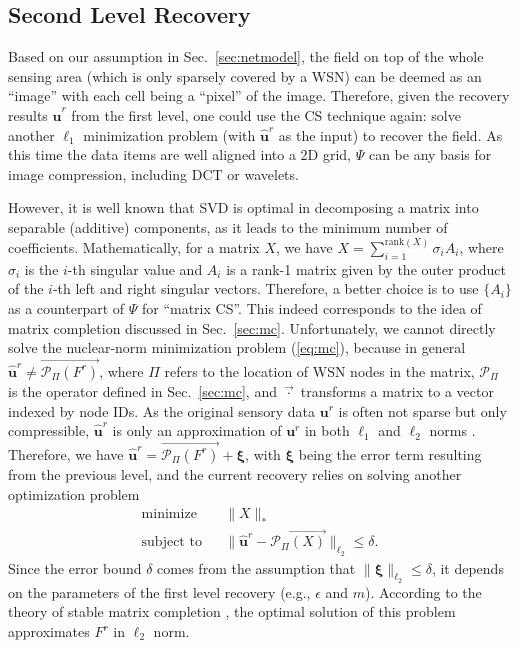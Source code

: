 \documentclass[conference]{IEEEtran}
\begin{document}
  \subsection{Second Level Recovery} \label{sec:2level}
Based on our assumption in Sec.~\ref{sec:netmodel}, the field on top of the whole sensing area (which is only sparsely covered by a WSN) can be deemed as an ``image'' with each cell being a ``pixel'' of the image. Therefore, given the recovery results $\mathbf{\hat{u}}^r$ from the first level, one could use the CS technique again: solve another $\ell_1$ minimization problem (with $\mathbf{\hat{u}}^r$ as the input) to recover the field. As this time the data items are well aligned into a 2D grid, $\Psi$ can be any basis for image compression, including DCT or wavelets.

    However, it is well known that SVD is optimal in decomposing a matrix into separable (additive) components, as it leads to the minimum number of coefficients. Mathematically, for a matrix $X$, we have $X = \sum_{i=1}^{\mathrm{rank}(X)}\sigma_i A_i$, where $\sigma_i$ is the $i$-th singular value and $A_i$ is a rank-1 matrix given by the outer product of the $i$-th left and right singular vectors. Therefore, a better choice is to use $\{A_i\}$ as a counterpart of $\Psi$ for ``matrix CS''. This indeed corresponds to the idea of matrix completion discussed in Sec.~\ref{sec:mc}. Unfortunately, we cannot directly solve the nuclear-norm minimization problem (\ref{eq:mc}), because in general $\mathbf{\hat{u}}^r \not= \overrightarrow{\mathcal{P}_\Pi(F^r)}$, where $\Pi$ refers to the location of WSN nodes in the matrix, $\mathcal{P}_\Pi$ is the operator defined in Sec.~\ref{sec:mc}, and $\overrightarrow{\cdot}$ transforms a matrix to a vector indexed by node IDs. As the original sensory data $\mathbf{u}^r$ is often not sparse but only compressible, $\mathbf{\hat{u}}^r$ is only an approximation of $\mathbf{u}^r$ in both $\ell_1$ and $\ell_2$ norms \cite{Candes-SPMag08}. Therefore, we have $\mathbf{\hat{u}}^r = \overrightarrow{\mathcal{P}_\Pi(F^r)} + \boldsymbol{\xi}$, with $\boldsymbol{\xi}$ being the error term resulting from the previous level, and the current recovery relies on solving another optimization problem
    \begin{eqnarray}
\mathrm{minimize} && \|X\|_\ast \label{eq:mc+} \\
\mbox{subject to} && \|\mathbf{\hat{u}}^r - \overrightarrow{\mathcal{P}_\Pi(X)}\|_{\ell_2} \le \delta. \nonumber
\end{eqnarray}
Since the error bound $\delta$ comes from the assumption that $\|\boldsymbol{\xi}\|_{\ell_2} \le \delta$, it depends on the parameters of the first level recovery (e.g., $\epsilon$ and $m$). According to the theory of stable matrix completion \cite{CandesP-ProcIEEE10}, the optimal solution of this problem approximates $F^r$ in $\ell_2$ norm.
\end{document}
